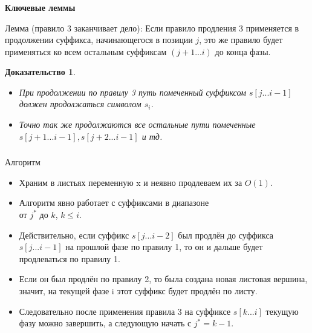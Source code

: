 \documentclass[t]{beamer}  %
\newtheorem{rproof}{Доказательство}
\begin{document}
\begin{frame}	
	\frametitle{\insertsubsection}
	
	\textbf{Ключевые леммы}
		
	\begin{block}{Лемма (правило 3 заканчивает дело):}
		Если правило продления 3 применяется в продолжении суффикса, начинающегося в позиции $j$, это же правило будет применяться ко всем остальным суффиксам $(j+1...i)$ до конца фазы.
	\end{block}
	\pause
	\begin{rproof}
		\begin{itemize}
			\pause
			\item При продолжении по правилу 3 путь помеченный суффиксом $s[j...i-1]$ должен продолжаться символом $s_{i}$. 
			\pause
			\item Точно так же продолжаются все остальные пути помеченные $s[j+1...i-1], s[j+2...i-1]$ и тд. 
		\end{itemize}
	\end{rproof}
\end{frame}

\begin{frame}
	\frametitle{\insertsubsection}
	\begin{block}{Алгоритм}
		\begin{itemize}
			\item Храним в листьях переменную x и неявно продлеваем их за $O(1)$.
			\pause
			\item Алгоритм явно работает с суффиксами в диапазоне 
			\\от $j^{*}$ до $k$, $k \leq i$.
			\pause
			\item Действительно, если суффикс $s[j...i-2]$ был продлён до суффикса $s[j...i-1]$ на прошлой фазе по правилу 1, то он и дальше будет продлеваться по правилу 1.
			\pause
			\item Если он был продлён по правилу 2, то была создана новая листовая вершина, значит, на текущей фазе i этот суффикс будет продлён по листу.
			\pause
			\item Следовательно после применения правила 3 на суффиксе $s[k...i]$ текущую фазу можно завершить, а следующую начать с $j^{*} = k - 1$.
		\end{itemize}
	\end{block}
\end{frame}
\end{document}
